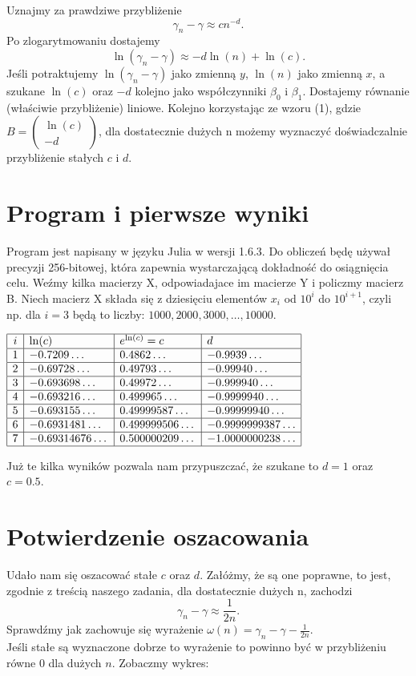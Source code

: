 \documentclass[a4paper,12pt]{article}
\begin{document}
Uznajmy za prawdziwe przybliżenie
$$ \gamma_n - \gamma \approx cn^{-d}. $$
Po zlogarytmowaniu dostajemy 
$$ \ln(\gamma_n - \gamma) \approx -d\ln(n) + \ln(c).$$
Jeśli potraktujemy $\ln(\gamma_n - \gamma)$ jako zmienną $y$, $\ln(n)$ jako zmienną $x$, a szukane $\ln(c)$ oraz $-d$ kolejno jako współczynniki $\beta_0$ i $\beta_1$. Dostajemy równanie (właściwie przybliżenie) liniowe. Kolejno korzystając ze wzoru (1), gdzie $B = \begin{pmatrix} \ln(c) \\ -d \end{pmatrix}$, dla dostatecznie dużych n możemy wyznaczyć doświadczalnie przybliżenie stałych $c$ i $d$.


\section{Program i pierwsze wyniki}

Program jest napisany w języku Julia w wersji 1.6.3. Do obliczeń będę używał precyzji 256-bitowej, która zapewnia wystarczającą dokładność do osiągnięcia celu.
Weźmy kilka macierzy X, odpowiadajace im macierze Y i policzmy macierz B.
Niech macierz X składa się z dziesięciu elementów $x_i$ od $10^i$ do $10^{i+1}$, czyli np. dla $i=3$ będą to liczby: $1000, 2000, 3000, \dots, 10 000$.

\begin{center}
$\begin{array}{|c|l|l|l|} \hline
i & \ln(c) & e^{\ln(c)} = c & d \\ \hline
1 & -0.7209 \dots & 0.4862 \dots & -0.9939 \dots \\ \hline
2 & -0.69728 \dots & 0.49793 \dots & -0.99940 \dots \\ \hline
3 & -0.693698 \dots & 0.49972 \dots & -0.999940 \dots \\ \hline
4 & -0.693216 \dots & 0.499965 \dots & -0.9999940 \dots \\ \hline
5 & -0.693155 \dots & 0.49999587 \dots & -0.99999940 \dots \\ \hline
6 & -0.6931481 \dots & 0.499999506 \dots & -0.9999999387 \dots \\ \hline
7 & -0.69314676 \dots & 0.500000209 \dots & -1.0000000238 \dots \\ \hline
\end{array}$
\end{center}
Już te kilka wyników pozwala nam przypuszczać, że szukane to $d = 1$ oraz $c = 0.5$.

\section{Potwierdzenie oszacowania}
Udało nam się oszacować stałe $c$ oraz $d$. Załóżmy, że są one poprawne, to jest, zgodnie z treścią naszego zadania, dla dostatecznie dużych n, zachodzi
$$ \gamma_n - \gamma \approx \frac{1}{2n}. $$
Sprawdźmy jak zachowuje się wyrażenie $ \omega(n) = \gamma_n - \gamma - \frac{1}{2n}.$ \\
Jeśli stałe są wyznaczone dobrze to wyrażenie to powinno być w przybliżeniu równe $0$ dla dużych $n$. Zobaczmy wykres:
\end{document}
